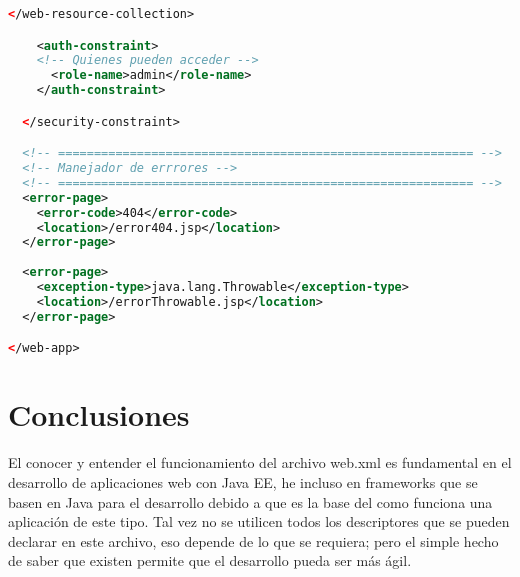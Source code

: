\documentclass[12pt, titlepage]{article}
\begin{document}
\begin{lstlisting}[language=XML, style=customXML]
    </web-resource-collection>

    <auth-constraint>
    <!-- Quienes pueden acceder -->
      <role-name>admin</role-name>
    </auth-constraint>

  </security-constraint>

  <!-- ========================================================== -->
  <!-- Manejador de errrores -->
  <!-- ========================================================== -->
  <error-page>
    <error-code>404</error-code>
    <location>/error404.jsp</location>
  </error-page>
  
  <error-page>
    <exception-type>java.lang.Throwable</exception-type>
    <location>/errorThrowable.jsp</location>
  </error-page>

</web-app> 
\end{lstlisting}


\section{Conclusiones}
El conocer y entender el funcionamiento del archivo web.xml es fundamental en 
el desarrollo de aplicaciones web con Java EE, he incluso en frameworks que se 
basen en Java para el desarrollo debido a que es la base del como funciona una 
aplicación de este tipo. Tal vez no se utilicen todos los descriptores que se 
pueden declarar en este archivo, eso depende de lo que se requiera; pero el 
simple hecho de saber que existen permite que el desarrollo pueda ser más ágil.



\end{document}
